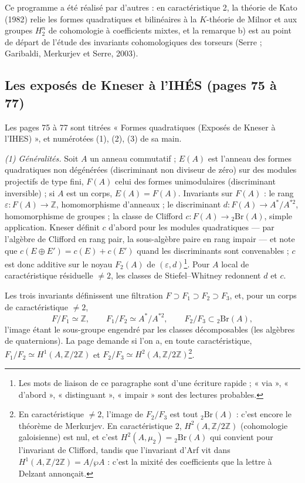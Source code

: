 \documentclass[11pt,a4paper]{article}
\begin{document}
Ce programme a été réalisé par d'autres : en caractéristique 2, la théorie de
Kato (1982) relie les formes quadratiques et bilinéaires à la $K$-théorie de
Milnor et aux groupes $H^n_2$ de cohomologie à coefficients mixtes, et la
remarque b) est au point de départ de l'étude des invariants cohomologiques des
torseurs (Serre ; Garibaldi, Merkurjev et Serre, 2003).

\subsection*{Les exposés de Kneser à l'IHÉS (pages 75 à 77)}

Les pages 75 à 77 sont titrées « Formes quadratiques (Exposés de Kneser à
l'IHES) », et numérotées (1), (2), (3) de sa main.

\emph{(1) Généralités.} Soit $A$ un anneau commutatif ; $E(A)$ est l'anneau des
formes quadratiques non dégénérées (discriminant non diviseur de zéro) sur des
modules projectifs de type fini, $F(A)$ celui des formes unimodulaires
(discriminant inversible) ; si $A$ est un corps, $E(A) = F(A)$. Invariants sur
$F(A)$ : le rang $\varepsilon : F(A) \to \mathbb{Z}$, homomorphisme d'anneaux ; le
discriminant $d : F(A) \to A^{*}/A^{*2}$, homomorphisme de groupes ; la classe de
Clifford $c : F(A) \to {}_2\mathrm{Br}(A)$, simple application. Kneser définit $c$
d'abord pour les modules quadratiques — par l'algèbre de Clifford en rang pair,
la sous-algèbre paire en rang impair — et note que $c(E \oplus E') = c(E) + c(E')$
quand les discriminants sont convenables ; $c$ est donc additive sur le noyau
$F_2(A)$ de $(\varepsilon, d)$\footnote{Les mots de liaison de ce paragraphe sont
d'une écriture rapide ; « via », « d'abord », « distinguant », « impair » sont des
lectures probables.}. Pour $A$ local de caractéristique résiduelle $\neq 2$, les
classes de Stiefel--Whitney redonnent $d$ et $c$.

Les trois invariants définissent une filtration
$F \supset F_1 \supset F_2 \supset F_3$, et, pour un corps de caractéristique
$\neq 2$,
\[
F/F_1 \simeq \mathbb{Z}, \qquad F_1/F_2 \simeq A^{*}/A^{*2}, \qquad
F_2/F_3 \subset {}_2\mathrm{Br}(A),
\]
l'image étant le sous-groupe engendré par les classes décomposables (les
algèbres de quaternions). La page demande si l'on a, en toute
caractéristique, $F_1/F_2 \simeq H^1(A, \mathbb{Z}/2\mathbb{Z})$ et $F_2/F_3 \simeq
H^2(A, \mathbb{Z}/2\mathbb{Z})$\footnote{En caractéristique $\neq 2$, l'image de
$F_2/F_3$ est tout ${}_2\mathrm{Br}(A)$ : c'est encore le théorème de Merkurjev. En
caractéristique 2, $H^2(A, \mathbb{Z}/2\mathbb{Z})$ (cohomologie galoisienne) est nul,
et c'est $H^2(A,\mu_2) = {}_2\mathrm{Br}(A)$ qui convient pour l'invariant de
Clifford, tandis que l'invariant d'Arf vit dans $H^1(A, \mathbb{Z}/2\mathbb{Z}) =
A/\wp A$ : c'est la mixité des coefficients que la lettre à Delzant annonçait.}.
\end{document}
